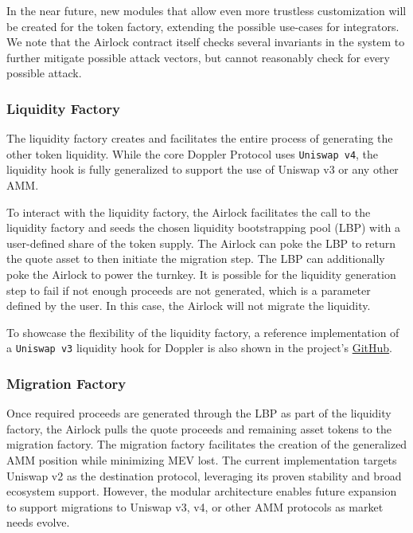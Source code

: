 \documentclass[sigconf,nonacm,prologue,table]{acmart}
\numberwithin{equation}{section}
\theoremstyle{definition}
\theoremstyle{remark}
\begin{document}
In the near future, new modules that allow even more trustless customization will be created for the token factory, extending the possible use-cases for integrators. We note that the Airlock contract itself checks several invariants in the system to further mitigate possible attack vectors, but cannot reasonably check for every possible attack.

\subsubsection{Liquidity Factory}

The liquidity factory creates and facilitates the entire process of generating the other token liquidity. While the core Doppler Protocol uses \verb|Uniswap v4|, the liquidity hook is fully generalized to support the use of Uniswap v3 or any other AMM.

To interact with the liquidity factory, the Airlock facilitates the call to the liquidity factory and seeds the chosen liquidity bootstrapping pool (LBP) with a user-defined share of the token supply. The Airlock can poke the LBP to return the quote asset to then initiate the migration step. The LBP can additionally poke the Airlock to power the turnkey. It is possible for the liquidity generation step to fail if not enough proceeds are not generated, which is a parameter defined by the user. In this case, the Airlock will not migrate the liquidity.

To showcase the flexibility of the liquidity factory, a reference implementation of a \verb|Uniswap v3| liquidity hook for Doppler is also shown in the project's \href{https://github.com/whetstoneresearch/doppler/tree/main}{GitHub}.

\subsubsection{Migration Factory}

Once required proceeds are generated through the LBP as part of the liquidity factory, the Airlock pulls the quote proceeds and remaining asset tokens to the migration factory. The migration factory facilitates the creation of the generalized AMM position while minimizing MEV lost. The current implementation targets Uniswap v2 as the destination protocol, leveraging its proven stability and broad ecosystem support. However, the modular architecture enables future expansion to support migrations to Uniswap v3, v4, or other AMM protocols as market needs evolve.
\end{document}
